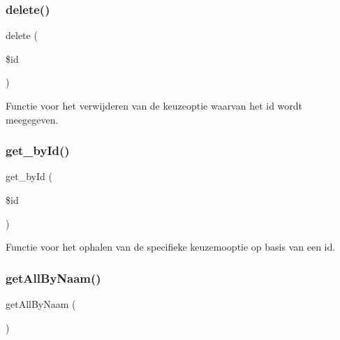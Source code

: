 \mbox{\label{class_keuzeoptie___model_a2f8258add505482d7f00ea26493a5723}} 
\subsubsection{\texorpdfstring{delete()}{delete()}}
{\footnotesize\ttfamily delete (\begin{DoxyParamCaption}\item[{}]{\$id }\end{DoxyParamCaption})}



Functie voor het verwijderen van de keuzeoptie waarvan het id wordt meegegeven. 

\mbox{\label{class_keuzeoptie___model_a98d28a4d9a29d40c5a8aa0176f19a919}} 
\subsubsection{\texorpdfstring{get\+\_\+by\+Id()}{get\_byId()}}
{\footnotesize\ttfamily get\+\_\+by\+Id (\begin{DoxyParamCaption}\item[{}]{\$id }\end{DoxyParamCaption})}



Functie voor het ophalen van de specifieke keuzemooptie op basis van een id. 

\mbox{\label{class_keuzeoptie___model_a2b035b1ffd1cbe651b35bb3e53d72c09}} 
\subsubsection{\texorpdfstring{get\+All\+By\+Naam()}{getAllByNaam()}}
{\footnotesize\ttfamily get\+All\+By\+Naam (\begin{DoxyParamCaption}{ }\end{DoxyParamCaption})}



